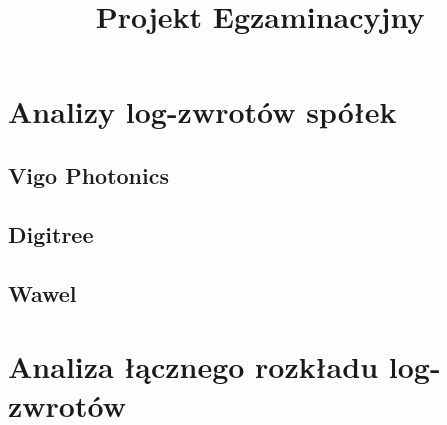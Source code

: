 \documentclass[a4paper,11pt]{article}
\title{Projekt Egzaminacyjny}
\begin{document}
\maketitle

\section{Analizy log-zwrotów spółek}

\subsection{Vigo Photonics}

\subsection{Digitree}

\subsection{Wawel}

\section{Analiza łącznego rozkładu log-zwrotów}
\end{document}
